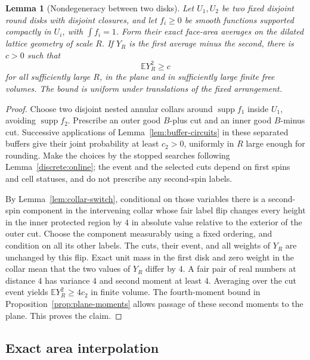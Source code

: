 \documentclass[11pt]{article}
\newtheorem{lemma}[theorem]{Lemma}
\theoremstyle{definition}
\theoremstyle{remark}
\numberwithin{equation}{section}
\begin{document}
\begin{lemma}[Nondegeneracy between two disks]\label{lem:nondegeneracy}
Let $U_1,U_2$ be two fixed disjoint round disks with disjoint closures,
and let $f_i\geq0$ be smooth functions supported compactly in $U_i$,
with $\int f_i=1$.  Form their exact face-area averages on the dilated
lattice geometry of scale $R$.  If $Y_R$ is the first average minus
the second, there is $c>0$ such that
\begin{equation}\label{moments:nondegeneracy}
 \mathbb E Y_R^2\geq c
\end{equation}
for all sufficiently large $R$, in the plane and in sufficiently large
finite free volumes.  The bound is uniform under translations of the
fixed arrangement.
\end{lemma}

\begin{proof}
Choose two disjoint nested annular collars around $\operatorname{supp} f_1$ inside
$U_1$, avoiding $\operatorname{supp} f_2$.  Prescribe an outer good $B$-plus cut and
an inner good $B$-minus cut.  Successive applications of
Lemma~\ref{lem:buffer-circuits} in these separated buffers give their
joint probability at least $c_2>0$, uniformly in $R$ large enough for
rounding.  Make the choices by the stopped searches following
Lemma~\ref{discrete:online}; the event and the selected cuts
depend on first spins and cell statuses, and do not prescribe any
second-spin labels.

By Lemma~\ref{lem:collar-switch}, conditional on those variables there
is a second-spin component in the intervening collar whose fair label
flip changes every height in the inner protected region by $4$ in
absolute value relative to the exterior of the outer cut.  Choose the
component measurably using a fixed ordering, and condition on all its
other labels.  The cuts, their event, and all weights of $Y_R$ are
unchanged by this flip.  Exact unit mass in the first disk and zero
weight in the collar mean that the two values of $Y_R$ differ by $4$.
A fair pair of real numbers at distance $4$ has variance $4$ and
second moment at least $4$.  Averaging over the cut event yields
$\mathbb E Y_R^2\geq4c_2$ in finite volume.  The fourth-moment bound in
Proposition~\ref{prop:plane-moments} allows passage of these second
moments to the plane.  This proves the claim.
\end{proof}

\subsection{Exact area interpolation}
\end{document}
